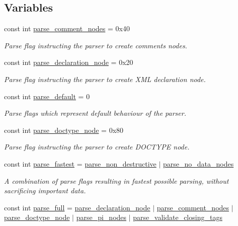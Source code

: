 \subsection*{Variables}
\begin{DoxyCompactItemize}
\item 
const int \mbox{\hyperlink{namespacerapidxml_a0f7479dacbc868456d07897a8c072784}{parse\+\_\+comment\+\_\+nodes}} = 0x40
\begin{DoxyCompactList}\small\item\em Parse flag instructing the parser to create comments nodes. \end{DoxyCompactList}\item 
const int \mbox{\hyperlink{namespacerapidxml_a52e2c934ad9c845a5f4cc49570470556}{parse\+\_\+declaration\+\_\+node}} = 0x20
\begin{DoxyCompactList}\small\item\em Parse flag instructing the parser to create X\+ML declaration node. \end{DoxyCompactList}\item 
const int \mbox{\hyperlink{namespacerapidxml_a45751cf2f38fd6915f35b3122b46d5b6}{parse\+\_\+default}} = 0
\begin{DoxyCompactList}\small\item\em Parse flags which represent default behaviour of the parser. \end{DoxyCompactList}\item 
const int \mbox{\hyperlink{namespacerapidxml_a8e187746ba1ca04f107951ad32df962e}{parse\+\_\+doctype\+\_\+node}} = 0x80
\begin{DoxyCompactList}\small\item\em Parse flag instructing the parser to create D\+O\+C\+T\+Y\+PE node. \end{DoxyCompactList}\item 
const int \mbox{\hyperlink{namespacerapidxml_a398c5476e76102f8bd76c10bb0abbe10}{parse\+\_\+fastest}} = \mbox{\hyperlink{namespacerapidxml_aa97ba1a0a79a6d66f4eef3612508d943}{parse\+\_\+non\+\_\+destructive}} $\vert$ \mbox{\hyperlink{namespacerapidxml_a87e8bbab53702cf3b438bd553c10b6b9}{parse\+\_\+no\+\_\+data\+\_\+nodes}}
\begin{DoxyCompactList}\small\item\em A combination of parse flags resulting in fastest possible parsing, without sacrificing important data. \end{DoxyCompactList}\item 
const int \mbox{\hyperlink{namespacerapidxml_ab4f2515265facb42291570307924bd57}{parse\+\_\+full}} = \mbox{\hyperlink{namespacerapidxml_a52e2c934ad9c845a5f4cc49570470556}{parse\+\_\+declaration\+\_\+node}} $\vert$ \mbox{\hyperlink{namespacerapidxml_a0f7479dacbc868456d07897a8c072784}{parse\+\_\+comment\+\_\+nodes}} $\vert$ \mbox{\hyperlink{namespacerapidxml_a8e187746ba1ca04f107951ad32df962e}{parse\+\_\+doctype\+\_\+node}} $\vert$ \mbox{\hyperlink{namespacerapidxml_a1c20b2b2b75711cd76423e119c49f830}{parse\+\_\+pi\+\_\+nodes}} $\vert$ \mbox{\hyperlink{namespacerapidxml_aa5daff9d61c7d4eaf98e4d42efe628ee}{parse\+\_\+validate\+\_\+closing\+\_\+tags}}

\end{DoxyCompactItemize}
